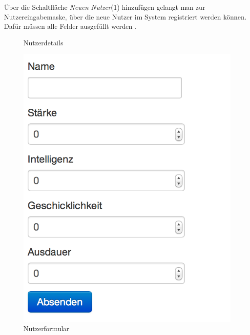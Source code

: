Über die Schaltfläche \textit{Neuen Nutzer}(1) hinzufügen gelangt man zur Nutzereingabemaske, über die neue Nutzer im System registriert werden können. Dafür müssen alle Felder ausgefüllt werden .
\begin{figure}[h!]
  \centering
  \caption{Nutzerdetails}
  \label{fig:Nutzerdetails}
\end{figure}

\begin{figure}[h!]
  \centering
  \includegraphics[scale=0.5]{img/Nutzerformular.png}
  \caption{Nutzerformular}
  \label{fig:Nutzerformular}
\end{figure}

